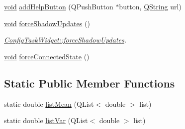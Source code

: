 \begin{DoxyCompactItemize}
\item 
\hyperlink{group___u_a_v_objects_plugin_ga444cf2ff3f0ecbe028adce838d373f5c}{void} \hyperlink{group___u_a_v_object_widget_utils_ga369a4d9a6a1eba7ba8e61e64f1d89b80}{add\-Help\-Button} (\-Q\-Push\-Button $\ast$button, \hyperlink{group___u_a_v_objects_plugin_gab9d252f49c333c94a72f97ce3105a32d}{\-Q\-String} url)
\item 
\hyperlink{group___u_a_v_objects_plugin_ga444cf2ff3f0ecbe028adce838d373f5c}{void} \hyperlink{group___u_a_v_object_widget_utils_gaae2888fd71dce34ad0c33aed78952e23}{force\-Shadow\-Updates} ()
\begin{DoxyCompactList}\small\item\em \hyperlink{group___u_a_v_object_widget_utils_gaae2888fd71dce34ad0c33aed78952e23}{\-Config\-Task\-Widget\-::force\-Shadow\-Updates}. \end{DoxyCompactList}\item 
\hyperlink{group___u_a_v_objects_plugin_ga444cf2ff3f0ecbe028adce838d373f5c}{void} \hyperlink{group___u_a_v_object_widget_utils_gaef1ebd891852a741315a8b69975876e6}{force\-Connected\-State} ()
\end{DoxyCompactItemize}
\subsection*{\-Static \-Public \-Member \-Functions}
\begin{DoxyCompactItemize}
\item 
static double \hyperlink{group___u_a_v_object_widget_utils_ga134c15f52a4eccf9aeb9bbacdc296b80}{list\-Mean} (\-Q\-List$<$ double $>$ list)
\item 
static double \hyperlink{group___u_a_v_object_widget_utils_ga2f33179993858ca636461e78e3a7a3c8}{list\-Var} (\-Q\-List$<$ double $>$ list)
\end{DoxyCompactItemize}
